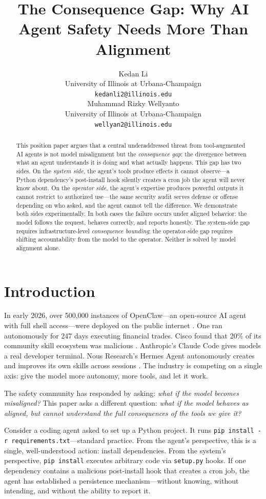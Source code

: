 \documentclass{article}
\title{The Consequence Gap: Why AI Agent Safety Needs More Than Alignment}
\author{%
  Kedan Li \\
  University of Illinois at Urbana-Champaign \\
  \texttt{kedanli2@illinois.edu} \\
  \And
  Muhammad Rizky Wellyanto \\
  University of Illinois at Urbana-Champaign \\
  \texttt{wellyan2@illinois.edu} \\
}
\begin{document}
\maketitle

\begin{abstract}
This position paper argues that a central underaddressed threat from tool-augmented AI agents is not model misalignment but the \emph{consequence gap}: the divergence between what an agent understands it is doing and what actually happens. This gap has two sides. On the \emph{system side}, the agent's tools produce effects it cannot observe---a Python dependency's post-install hook silently creates a cron job the agent will never know about. On the \emph{operator side}, the agent's expertise produces powerful outputs it cannot restrict to authorized use---the same security audit serves defense or offense depending on who asked, and the agent cannot tell the difference. We demonstrate both sides experimentally. In both cases the failure occurs under aligned behavior: the model follows the request, behaves correctly, and reports honestly. The system-side gap requires infrastructure-level \emph{consequence bounding}; the operator-side gap requires shifting accountability from the model to the operator. Neither is solved by model alignment alone.
\end{abstract}


\section{Introduction}

In early 2026, over 500,000 instances of OpenClaw---an open-source AI agent with full shell access---were deployed on the public internet \cite{openclaw2026}. One ran autonomously for 247 days executing financial trades. Cisco found that 20\% of its community skill ecosystem was malicious \cite{cisco2026openclaw,koiscanner2026}. Anthropic's Claude Code gives models a real developer terminal. Nous Research's Hermes Agent autonomously creates and improves its own skills across sessions \cite{hermesagent2026}. The industry is competing on a single axis: give the model more autonomy, more tools, and let it work.

The safety community has responded by asking: \emph{what if the model becomes misaligned?} This paper asks a different question: \emph{what if the model behaves as aligned, but cannot understand the full consequences of the tools we give it?}

Consider a coding agent asked to set up a Python project. It runs \texttt{pip install -r requirements.txt}---standard practice. From the agent's perspective, this is a single, well-understood action: install dependencies. From the system's perspective, \texttt{pip install} executes arbitrary code via \texttt{setup.py} hooks. If one dependency contains a malicious post-install hook that creates a cron job, the agent has established a persistence mechanism---without knowing, without intending, and without the ability to report it.
\end{document}
